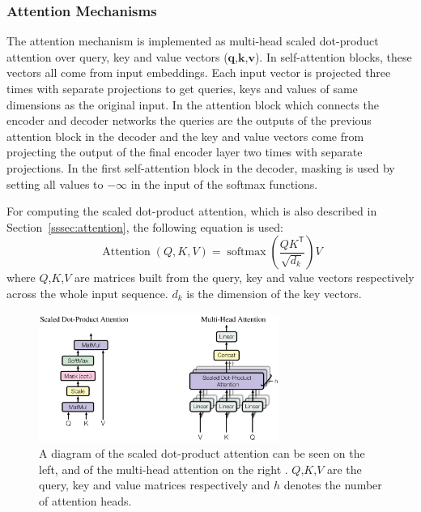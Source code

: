 \documentclass[12pt]{article}
\DeclareMathOperator{\Attention}{Attention}
\DeclareMathOperator{\softmax}{softmax}
\begin{document}
\subsubsection{Attention Mechanisms} \label{sssec:trf_attention}
The attention mechanism is implemented as multi-head scaled dot-product attention over query, key and value vectors (\(\bm{q}\),\(\bm{k}\),\(\bm{v}\)). In self-attention blocks, these vectors all come from input embeddings. Each input vector is projected three times with separate projections to get queries, keys and values of same dimensions as the original input. In the attention block which connects the encoder and decoder networks the queries are the outputs of the previous attention block in the decoder and the key and value vectors come from projecting the output of the final encoder layer two times with separate projections. In the first self-attention block in the decoder, masking is used by setting all values to \(-\infty\) in the input of the softmax functions.

For computing the scaled dot-product attention, which is also described in Section~\ref{sssec:attention}, the following equation is used:
\begin{equation}
\Attention(Q,K,V)=\softmax\left(\frac{QK^\mathsf{T}}{\sqrt{d_k}}\right)V
\end{equation}
where \(Q\),\(K\),\(V\) are matrices built from the query, key and value vectors respectively across the whole input sequence. \(d_k\) is the dimension of the key vectors.

\begin{figure}[H] 
	\centering
	\includegraphics[width=0.7\textwidth]{pics/trf_attention.png}
	\caption{A diagram of the scaled dot-product attention can be seen on the left, and of the multi-head attention on the right \cite{Vaswani:2017}. \(Q\),\(K\),\(V\) are the query, key and value matrices respectively and \(h\) denotes the number of attention heads.}
	\label{fig:trf_attention}
\end{figure}
\end{document}
